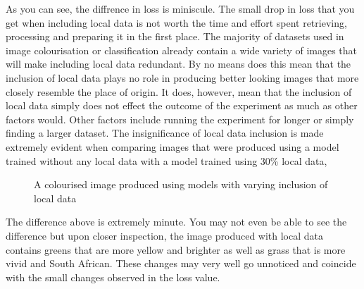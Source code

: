 \documentclass[conference]{IEEEtran}
\begin{document}
As you can see, the diffrence in loss is miniscule. The small drop in loss that you get when including local data is not worth the time and effort spent retrieving, processing and preparing it in the first place. The majority of datasets used in image colourisation or classification already contain a wide variety of images that will make including local data redundant. By no means does this mean that the inclusion of local data plays no role in producing better looking images that more closely resemble the place of origin. It does, however, mean that the inclusion of local data simply does not effect the outcome of the experiment as much as other factors would. Other factors include running the experiment for longer or simply finding a larger dataset. The insignificance of local data inclusion is made extremely evident when comparing images that were produced using a model trained without any local data with a model trained using 30\% local data,

\begin{figure}[h!]
    \centering
    \qquad
    \caption{A colourised image produced using models with varying inclusion of local data}%
    \label{fig:inclusion_compare}
\end{figure}

The difference above is extremely minute. You may not even be able to see the difference but upon closer inspection, the image produced with local data contains greens that are more yellow and brighter as well as grass that is more vivid and South African. These changes may very well go unnoticed and coincide with the small changes observed in the loss value.
\end{document}
